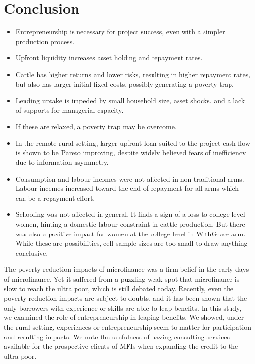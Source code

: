 \section{Conclusion}
\label{SecConclusion}

\begin{mdframed}[style={SecItemize}, frametitle={Conclusion}]
\begin{itemize}
\vspace{1.0ex}\setlength{\itemsep}{1.0ex}\setlength{\baselineskip}{12pt}
\item	Entrepreneurship is necessary for project success, even with a simpler production process.
\item	Upfront liquidity increases asset holding and repayment rates.
\item	Cattle has higher returns and lower risks, resulting in higher repayment rates, but also has larger initial fixed costs, possibly generating a poverty trap.
\item	Lending uptake is impeded by small household size, asset shocks, and a lack of supports for managerial capacity.
\item	If these are relaxed, a poverty trap may be overcome.
\item	In the remote rural setting, larger upfront loan suited to the project cash flow is shown to be Pareto improving, despite widely believed fears of inefficiency due to information asymmetry.
\item	Consumption and labour incomes were not affected in non-\textsf{traditional} arms. Labour incomes increased toward the end of repayment for all arms which can be a repayment effort.
\item	Schooling was not affected in general. It finds a sign of a loss to college level women, hinting a domestic labour constraint in cattle production. But there was also a positive impact for women at the college level in \textsf{WithGrace} arm. While these are possibilities, cell sample sizes are too small to draw anything conclusive.
\end{itemize}
\end{mdframed}

	The poverty reduction impacts of microfinance was a firm belief in the early days of microfinance. Yet it suffered from a puzzling weak spot that microfinance is slow to reach the ultra poor, which is still debated today. Recently, even the poverty reduction impacts are subject to doubts, and it has been shown that the only borrowers with experience or skills are able to leap benefits. In this study, we examined the role of entrepreneurship in leaping benefits. We showed, under the rural setting, experiences or entrepreneurship seem to matter for participation and resulting impacts. We note the usefulness of having consulting services available for the prospective clients of MFIs when expanding the credit to the ultra poor. 


